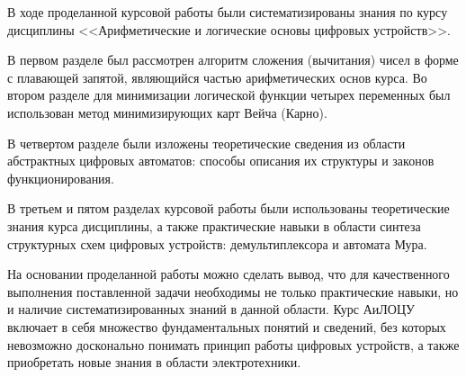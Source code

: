 
В ходе проделанной курсовой работы были систематизированы знания по курсу дисциплины <<Арифметические и логические основы цифровых устройств>>.

В первом разделе был рассмотрен алгоритм сложения (вычитания) чисел в форме с плавающей запятой,
являющийся частью арифметических основ курса.
Во втором разделе для минимизации логической функции четырех переменных был использован метод
минимизирующих карт Вейча (Карно).

В четвертом разделе были изложены теоретические сведения из области абстрактных цифровых автоматов: способы описания 
их структуры и законов функционирования.

В третьем и пятом разделах курсовой работы были использованы теоретические знания курса дисциплины,
а также практические навыки в области синтеза структурных схем цифровых устройств: демультиплексора и автомата Мура.

На основании проделанной работы можно сделать вывод, что для качественного выполнения поставленной задачи 
необходимы не только практические навыки, но и наличие систематизированных знаний в данной области.
Курс АиЛОЦУ включает в себя множество фундаментальных понятий и сведений, без которых невозможно
досконально понимать принцип работы цифровых устройств, а также приобретать новые знания
в области электротехники.